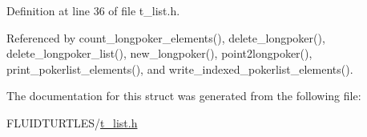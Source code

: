 Definition at line 36 of file t\-\_\-list.\-h.



Referenced by count\-\_\-longpoker\-\_\-elements(), delete\-\_\-longpoker(), delete\-\_\-longpoker\-\_\-list(), new\-\_\-longpoker(), point2longpoker(), print\-\_\-pokerlist\-\_\-elements(), and write\-\_\-indexed\-\_\-pokerlist\-\_\-elements().



The documentation for this struct was generated from the following file\-:\begin{DoxyCompactItemize}
\item 
F\-L\-U\-I\-D\-T\-U\-R\-T\-L\-E\-S/\hyperlink{t__list_8h}{t\-\_\-list.\-h}\end{DoxyCompactItemize}
